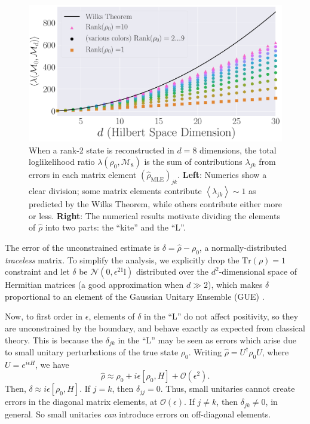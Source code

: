 \documentclass[aps,pra, twocolumn]{revtex4}
\newcommand{\Tr}{\mathrm{Tr}}
\newcommand{\expect}[1]{\ensuremath{\left\langle#1\right\rangle}}
\def\Id{1\!\mathrm{l}}
\newcommand{\rhohat}{\hat{\rho}}
\newcommand{\rhoMLE}{\rhohat_{\scriptscriptstyle\mathrm{MLE}}}
\begin{document}
\begin{figure}[h]
\includegraphics[width=\columnwidth]{Images/Figure_2.pdf}
 \caption{When a rank-2 state is reconstructed in $d=8$ dimensions, the total loglikelihood ratio $\lambda(\rho_0,\mathcal{M}_8)$ is the sum of contributions $\lambda_{jk}$ from errors in each matrix element $(\rhoMLE)_{jk}$.  \textbf{Left}:  Numerics show a clear division; some matrix elements contribute $\expect{\lambda_{jk}}\sim1$ as predicted by the Wilks Theorem, while others contribute either more or less. \textbf{Right}:  The numerical results motivate dividing the elements of $\rhohat$ into two parts: the ``kite'' and the ``L''.}
\label{fig:L}
\end{figure}

The error of the unconstrained estimate is $\delta = \hat\rho- \rho_{0}$, a normally-distributed \emph{traceless} matrix.  To simplify the analysis, we explicitly drop the $\Tr(\rho)=1$ constraint and let $\delta$ be $\mathcal{N}(0,\epsilon^2\Id)$ distributed over the $d^2$-dimensional space of Hermitian matrices (a good approximation when $d\gg2$), which makes $\delta$ proportional to an element of the Gaussian Unitary Ensemble (GUE) \cite{Fyodorov2005}.  

Now, to first order in $\epsilon$, elements of $\delta$ in the ``L'' do not affect positivity, so they are unconstrained by the boundary, and behave exactly as expected from classical theory. This is because the $\delta_{jk}$ in the ``L'' may be seen as errors which arise due to small unitary perturbations of the true state $\rho_{0}$. Writing $\rhohat = U^{\dagger}\rho_{0}U$, where $U=e^{i\epsilon H}$, we have
\[\rhohat \approx \rho_{0} + i\epsilon [\rho_{0},H]+\mathcal{O}(\epsilon^{2}).\]
Then, $\delta \approx i\epsilon [\rho_{0},H]$.
If $j = k$, then $\delta_{jj} = 0$. Thus, small unitaries cannot create errors in the diagonal matrix elements, at $\mathcal{O}(\epsilon)$. If $j \neq k$, then $\delta_{jk} \neq 0$, in general. So small unitaries \emph{can} introduce errors on off-diagonal elements.
\end{document}

